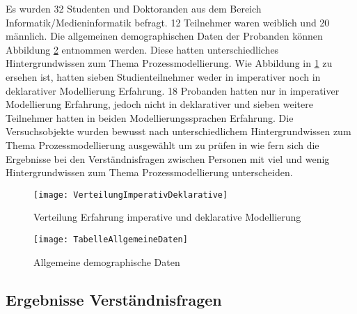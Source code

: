 Es wurden 32 Studenten und Doktoranden aus dem Bereich Informatik/Medieninformatik befragt. 12 Teilnehmer waren weiblich und 20 männlich. Die allgemeinen demographischen Daten der Probanden können Abbildung \ref{fig:TabelleAllgemeineDaten} entnommen werden. Diese hatten unterschiedliches Hintergrundwissen zum Thema Prozessmodellierung. Wie Abbildung in \ref{fig:VerteilungImperativDeklarative} zu ersehen ist, hatten sieben Studienteilnehmer weder in imperativer noch in deklarativer Modellierung Erfahrung. 18 Probanden hatten nur in imperativer Modellierung Erfahrung, jedoch nicht in deklarativer und sieben weitere Teilnehmer hatten in beiden Modellierungssprachen Erfahrung. Die Versuchsobjekte wurden bewusst nach unterschiedlichem Hintergrundwissen zum Thema Prozessmodellierung ausgewählt um zu prüfen in wie fern sich die Ergebnisse bei den Verständnisfragen zwischen Personen mit viel und wenig Hintergrundwissen zum Thema Prozessmodellierung unterscheiden.\newline


\begin{figure}[htp]
\begin{center}
  \texttt{[image: VerteilungImperativDeklarative]} %
  \caption{Verteilung Erfahrung imperative und deklarative Modellierung}
  \label{fig:VerteilungImperativDeklarative}
\end{center}
\end{figure}

\begin{figure}[htp]
\begin{center}
  \texttt{[image: TabelleAllgemeineDaten]} %
  \caption{Allgemeine demographische Daten}
  \label{fig:TabelleAllgemeineDaten}
\end{center}
\end{figure}



\subsection{Ergebnisse Verständnisfragen}

